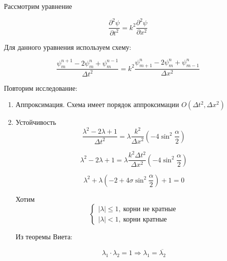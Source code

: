 \documentclass[10pt,a4paper]{article}
\begin{document}
	Рассмотрим уравнение
	
	\begin{equation}
		\frac{\partial^{2} \psi}{\partial t^{2}} = k^{2}\frac{\partial^{2} \psi}
		{\partial x^{2}}
	\end{equation}
	
	Для данного уравнения используем схему:
	
	\begin{equation}
		\frac{\psi_{m}^{n + 1} - 2\psi_{m}^{n} + \psi_{m}^{n - 1}}{\Delta t^{2}}
		= k^{2}\frac{\psi_{m + 1}^{n} - 2\psi_{m}^{n} + \psi_{m - 1}^{n}}
		{\Delta x^{2}}
	\end{equation}
	
	Повторим исследование:
	
	\begin{enumerate}
		\item Аппроксимация. Схема имеет порядок аппроксимации $O\left(
		\Delta t^{2}, \Delta x^{2}\right)$
		\item Устойчивость
		\begin{equation}
			\frac{\lambda^{2} - 2\lambda + 1}{\Delta t^{2}} = 
			\lambda\frac{k^{2}}{\Delta x^{2}}\left( - 4\sin^2\frac{\alpha}{2}
			\right)
		\end{equation}
		
		\begin{equation}
			\lambda^{2} - 2\lambda + 1 = \lambda\frac{k^{2}\Delta t^{2}}
			{\Delta x^{2}}\left(-4\sin^{2}\frac{\alpha}{2}\right)
		\end{equation}
		
		\begin{equation}
			\lambda^{2} + \lambda\left(-2 + 4\sigma\sin^{2}\frac{\alpha}{2}
			\right) + 1 = 0
		\end{equation}
		
		Хотим
		\begin{equation}
			\begin{cases}
				\left|\lambda\right| \leqslant 1, \ \text{корни не кратные}
				\\
				\left|\lambda\right|  < 1, \ \text{корни кратные}
			\end{cases}
		\end{equation}
		
		Из теоремы Виета:
		
		\begin{equation}
			\lambda_{1}\cdot\lambda_{2} = 1 \Rightarrow \lambda_{1} = 
			\overline{\lambda_{2}}
		\end{equation}
		

\end{enumerate}
\end{document}
